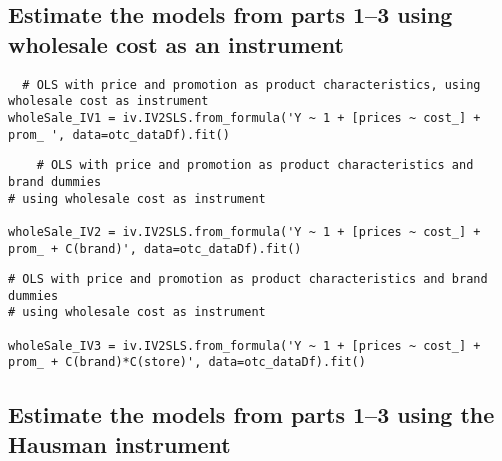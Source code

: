 \documentclass[dvipsnames]{article}
\begin{document}
\subsection*{Estimate the models from parts 1--3 using wholesale cost as an instrument}
\begin{verbatim}
  # OLS with price and promotion as product characteristics, using wholesale cost as instrument
wholeSale_IV1 = iv.IV2SLS.from_formula('Y ~ 1 + [prices ~ cost_] + prom_ ', data=otc_dataDf).fit()
\end{verbatim}
\begin{table}[htp]
  \centering
  
  \end{table}
 
  \newpage

  \begin{verbatim}
    # OLS with price and promotion as product characteristics and brand dummies
# using wholesale cost as instrument

wholeSale_IV2 = iv.IV2SLS.from_formula('Y ~ 1 + [prices ~ cost_] + prom_ + C(brand)', data=otc_dataDf).fit()
\end{verbatim}
\begin{table}[htp]
  \centering
  
  \end{table}

  \begin{verbatim}
# OLS with price and promotion as product characteristics and brand dummies
# using wholesale cost as instrument

wholeSale_IV3 = iv.IV2SLS.from_formula('Y ~ 1 + [prices ~ cost_] + prom_ + C(brand)*C(store)', data=otc_dataDf).fit()
    \end{verbatim}
\begin{table}[htp]
  \centering
  
  \end{table}

\newpage
  \subsection*{Estimate the models from parts 1--3 using the Hausman instrument}

\begin{table}[htp]
  \centering
  
  \end{table}
  \newpage

\begin{table}[htp]
  \centering
  
  \end{table}
\end{document}
